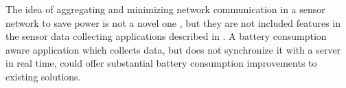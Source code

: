 The idea of aggregating and minimizing network communication in a sensor network to save power is not a novel one \parencite{korteweg2007data} \parencite{mhatre2004design}, but they are not included features in the sensor data collecting applications described in . A battery consumption aware application which collects data, but does not synchronize it with a server in real time, could offer substantial battery consumption improvements to existing solutions. 